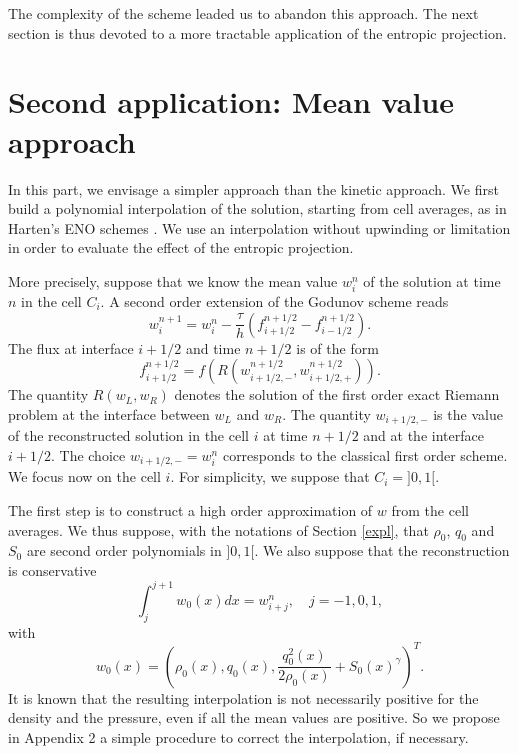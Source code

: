 \documentclass{fldauth}
\theoremstyle{plain}
\theoremstyle{plain}
\theoremstyle{plain}
\theoremstyle{plain}
\theoremstyle{plain}
\theoremstyle{plain}
\begin{document}
The complexity of the scheme leaded us to abandon this approach.
The next section is thus devoted to a more tractable application
of the entropic projection.

\section{Second application: Mean value approach}

In this part, we envisage a simpler approach than the kinetic
approach. We first build a polynomial interpolation of the
solution, starting from cell averages, as in Harten's ENO schemes
\cite{harten89}. We use an interpolation without upwinding or
limitation in order to evaluate the effect of the entropic
projection.

More precisely, suppose that we know the mean value $w_i^n$ of the
solution  at time $n$ in the cell $C_i$. A second order extension
of the Godunov scheme reads
\begin{equation}\label{godu2}
w_i^{n + 1}  = w_i^n  - \frac{\tau } {h}(f_{i + 1/2}^{n + 1/2}  -
f_{i - 1/2}^{n + 1/2} ).
\end{equation}
The flux at interface $i+1/2$ and time ${n+1/2}$ is of the
form\begin{equation}\label{flux2} f_{i + 1/2}^{n + 1/2}  =
f(R(w_{i + 1/2, - }^{n + 1/2} ,w_{i + 1/2, + }^{n + 1/2} )).
\end{equation}
The quantity $R(w_L,w_R)$ denotes the solution of the first order
exact Riemann problem at the interface between $w_L$ and $w_R$.
The quantity $w_{i + 1/2, - }$ is the value of the reconstructed
solution in the cell $i$ at time $n+1/2$ and at the interface
$i+1/2$. The choice $w_{i + 1/2, - }=w_i^n$ corresponds to the
classical first order scheme. We focus now on the cell $i$. For
simplicity, we suppose that $C_i=]0,1[$.

The first step is to construct a high order approximation of $w$
from the cell averages. We thus suppose, with the notations of
Section \ref{expl}, that $\rho_0$, $q_0$ and $S_0$ are second
order polynomials in $]0,1[$. We also suppose that the
reconstruction is conservative \begin{equation} \int_j^{j + 1}
{w_0 (x)dx} = w_{i + j}^n ,\quad j =  - 1,0,1,
\end{equation}
with
\begin{equation}
w_0 (x) = (\rho _0 (x),q_0 (x),\frac{{q_0^2 (x)}} {{2\rho _0 (x)}}
+ S_0 (x)^\gamma  )^T .
\end{equation}
It is known that the resulting interpolation is not necessarily
positive for the density and the pressure, even if all the mean
values are positive. So we propose in Appendix 2 a simple
procedure to correct the interpolation, if necessary.
\end{document}
